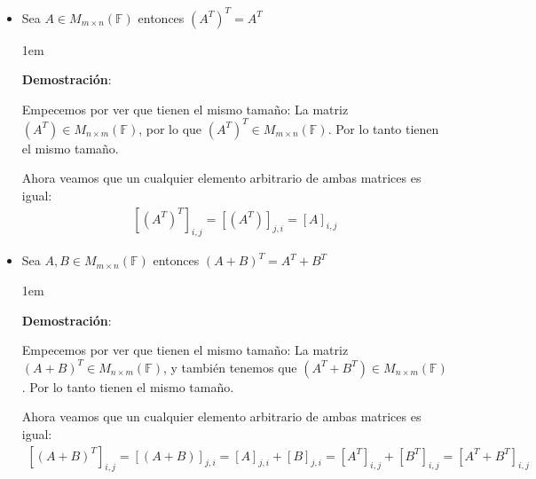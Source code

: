 \documentclass[12pt, fleqn]{report}                             %
\newenvironment{SmallIndentation}[1][0.75em]                    %
    {\begin{adjustwidth}{#1}{}\begin{footnotesize}}                 %
    {\end{footnotesize}\end{adjustwidth}}                           %
\begin{document}
                \begin{itemize}

                    \item Sea $A\in M_{m \times n}(\mathbb{F})$ entonces $(A^T)^T = A^T$
                        \begin{SmallIndentation}[1em]
                            \textbf{Demostración}:

                            Empecemos por ver que tienen el mismo tamaño:
                            La matriz $(A^T) \in M_{n \times m}(\mathbb{F})$, por lo que 
                            $(A^T)^T \in M_{m \times n}(\mathbb{F})$.
                            Por lo tanto tienen el mismo tamaño.

                            Ahora veamos que un cualquier elemento arbitrario de ambas matrices es igual:
                            \begin{equation*}
                            \begin{split}
                                [(A^T)^T]_{i, j}    
                                    = [(A^T)]_{j, i}               
                                = [A]_{i, j}
                            \end{split}
                            \end{equation*}

                        \end{SmallIndentation}

                    \item Sea $A,B \in M_{m \times n}(\mathbb{F})$ entonces 
                        $(A+B)^T = A^T + B^T$

                        \begin{SmallIndentation}[1em]
                            \textbf{Demostración}:

                            Empecemos por ver que tienen el mismo tamaño:
                            La matriz $(A+B)^T \in M_{n \times m}(\mathbb{F})$, y también tenemos que
                            $(A^T+B^T) \in M_{n \times m}(\mathbb{F})$. Por lo tanto tienen el mismo
                            tamaño.

                            Ahora veamos que un cualquier elemento arbitrario de ambas matrices es igual:
                            \begin{equation*}
                            \begin{split}
                                [(A+B)^T]_{i, j}    
                                    = [(A+B)]_{j, i}               
                                    = [A]_{j, i} + [B]_{j, i}      
                                    = [A^T]_{i, j} + [B^T]_{i, j}
                                = [A^T + B^T]_{i, j}
                            \end{split}
                            \end{equation*}


\end{SmallIndentation}
\end{itemize}
\end{document}
